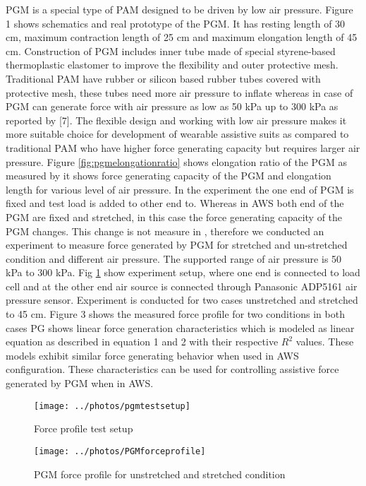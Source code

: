 \documentclass[letterpaper, 10 pt, conference]{ieeeconf}  %
\begin{document}
PGM is a special type of PAM designed to be driven by low air pressure. Figure 1 shows schematics and real prototype of the PGM. It has resting length of 30 cm, maximum contraction length of 25 cm and maximum elongation length of 45 cm. Construction of PGM includes inner tube made of special styrene-based thermoplastic elastomer to improve the flexibility and outer protective mesh. Traditional PAM have rubber or silicon based rubber tubes covered with protective mesh, these tubes need more air pressure to inflate whereas in case of PGM can generate force with air pressure as low as 50 kPa up to 300 kPa as reported by [7]. The flexible design and working with low air pressure makes it more suitable choice for development of wearable assistive suits as compared to traditional PAM who have higher force generating capacity but requires larger air pressure. Figure \ref{fig:pgmelongationratio} shows elongation ratio of the PGM as measured by \cite{7} it shows force generating capacity of the PGM and elongation length for various level of air pressure. In the experiment the one end of PGM is fixed and test load is added to other end to. Whereas in AWS both end of the PGM are fixed and stretched, in this case the force generating capacity of the PGM changes. This change is not measure in \cite{7}, therefore we conducted an experiment to measure force generated by PGM for stretched and un-stretched condition and different air pressure. The supported range of air pressure is 50 kPa to 300 kPa. Fig \ref{fig:pgmtest} show experiment setup, where one end is connected to load cell and at the other end air source is connected through Panasonic ADP5161 air pressure sensor. Experiment is conducted for two cases unstretched and stretched to 45 cm. Figure 3 shows the measured force profile for two conditions in both cases PG shows linear force generation characteristics which is modeled as linear equation as described in equation 1 and 2 with their respective $R^2$ values. These models exhibit similar force generating behavior when used in AWS configuration. These characteristics can be used for controlling assistive force generated by PGM when in AWS.

\begin{figure}
	\centering
	\texttt{[image: ../photos/pgmtestsetup]}
	\caption{Force profile test setup}
	\label{fig:pgmtest}
\end{figure}

\begin{figure}
	\centering
	\texttt{[image: ../photos/PGMforceprofile]}
	\caption{PGM force profile for unstretched and stretched condition}
	\label{fig:pgmforceprofile}
\end{figure}
\end{document}
